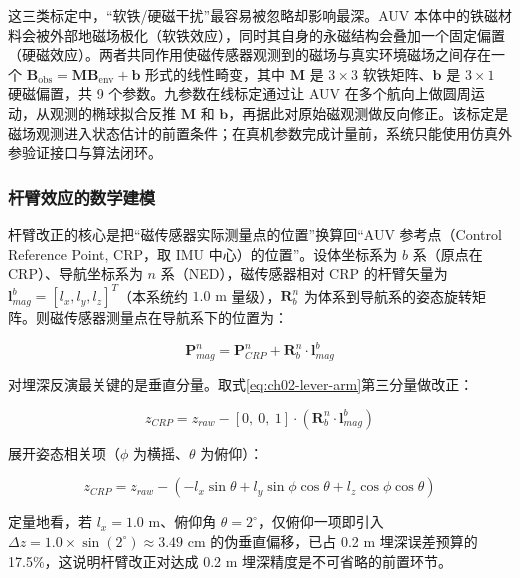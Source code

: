 这三类标定中，``软铁/硬磁干扰''最容易被忽略却影响最深。AUV 本体中的铁磁材料会被外部地磁场极化（软铁效应），同时其自身的永磁结构会叠加一个固定偏置（硬磁效应）。两者共同作用使磁传感器观测到的磁场与真实环境磁场之间存在一个 \(\boldsymbol{B}_{\mathrm{obs}}=\boldsymbol{M}\boldsymbol{B}_{\mathrm{env}}+\boldsymbol{b}\) 形式的线性畸变，其中 \(\boldsymbol{M}\) 是 \(3\times3\) 软铁矩阵、\(\boldsymbol{b}\) 是 \(3\times1\) 硬磁偏置，共 9 个参数。九参数在线标定\cite{cui2018magnetometer,vasconcelos2011geometric}通过让 AUV 在多个航向上做圆周运动，从观测的椭球拟合反推 \(\boldsymbol{M}\) 和 \(\boldsymbol{b}\)，再据此对原始磁观测做反向修正。该标定是磁场观测进入状态估计的前置条件；在真机参数完成计量前，系统只能使用仿真外参验证接口与算法闭环。

\subsubsection{杆臂效应的数学建模}\label{sec:ch02-2-4-2-1}

杆臂改正的核心是把``磁传感器实际测量点的位置''换算回``AUV 参考点（Control Reference Point, CRP，取 IMU 中心）的位置''。设体坐标系为 \(b\) 系（原点在 CRP）、导航坐标系为 \(n\) 系（NED），磁传感器相对 CRP 的杆臂矢量为 \(\boldsymbol{l}_{mag}^b = [l_x, l_y, l_z]^T\)（本系统约 \(1.0\text{ m}\) 量级），\(\boldsymbol{R}_b^n\) 为体系到导航系的姿态旋转矩阵。则磁传感器测量点在导航系下的位置为：

\begin{equation}
\boldsymbol{P}_{mag}^n = \boldsymbol{P}_{CRP}^n + \boldsymbol{R}_b^n \cdot \boldsymbol{l}_{mag}^b
\label{eq:ch02-lever-arm}
\end{equation}

对埋深反演最关键的是垂直分量。取式\eqref{eq:ch02-lever-arm}第三分量做改正：

\begin{equation}
z_{CRP} = z_{raw} - [0,\ 0,\ 1]\cdot(\boldsymbol{R}_b^n \cdot \boldsymbol{l}_{mag}^b)
\label{eq:ch02-lever-arm-z}
\end{equation}

展开姿态相关项（\(\phi\) 为横摇、\(\theta\) 为俯仰）：

\begin{equation}
z_{CRP} = z_{raw} - \left(-l_x\sin\theta + l_y\sin\phi\cos\theta + l_z\cos\phi\cos\theta\right)
\label{eq:ch02-lever-arm-expand}
\end{equation}

定量地看，若 \(l_x = 1.0\text{ m}\)、俯仰角 \(\theta = 2^\circ\)，仅俯仰一项即引入 \(\Delta z = 1.0\times\sin(2^\circ) \approx 3.49\text{ cm}\) 的伪垂直偏移，已占 0.2 m 埋深误差预算的 17.5\%，这说明杆臂改正对达成 0.2 m 埋深精度是不可省略的前置环节。

